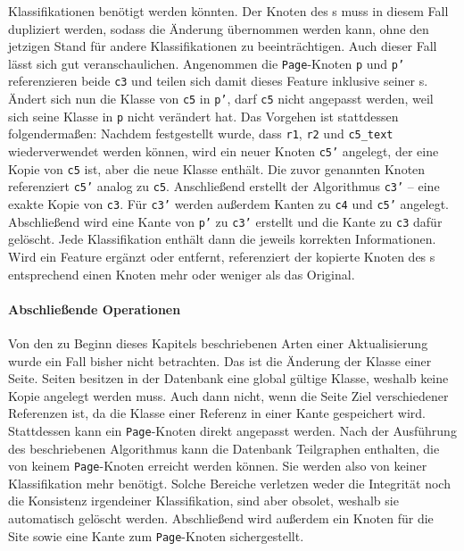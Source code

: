\begin{enumerate}
        Klassifikationen benötigt werden könnten.
        Der Knoten des {\parentFeature}s muss in diesem Fall dupliziert werden,
        sodass die Änderung übernommen werden kann,
        ohne den jetzigen Stand für andere Klassifikationen zu beeinträchtigen.
        Auch dieser Fall lässt sich gut veranschaulichen.
        Angenommen die \texttt{Page}-Knoten \texttt{p} und \texttt{p'} referenzieren beide \texttt{c3} und teilen sich damit
        dieses Feature inklusive seiner {\childFeature}s.
        Ändert sich nun die Klasse von \texttt{c5} in \texttt{p'},
        darf \texttt{c5} nicht angepasst werden, weil sich seine Klasse in \texttt{p} nicht verändert hat.
        Das Vorgehen ist stattdessen folgendermaßen:
        Nachdem festgestellt wurde, dass \texttt{r1}, \texttt{r2} und \texttt{c5\_text} wiederverwendet werden können,
        wird ein neuer Knoten \texttt{c5'} angelegt, der eine Kopie von \texttt{c5} ist, aber die neue Klasse enthält.
        Die zuvor genannten Knoten referenziert \texttt{c5'} analog zu \texttt{c5}.
        Anschließend erstellt der Algorithmus \texttt{c3'} -- eine exakte Kopie von \texttt{c3}.
        Für \texttt{c3'} werden außerdem Kanten zu \texttt{c4} und \texttt{c5'} angelegt.
        Abschließend wird eine Kante von \texttt{p'} zu \texttt{c3'} erstellt und die Kante zu \texttt{c3} dafür gelöscht.
        Jede Klassifikation enthält dann die jeweils korrekten Informationen.
        Wird ein Feature ergänzt oder entfernt, referenziert der kopierte Knoten des {\parentFeature}s
        entsprechend einen Knoten mehr oder weniger als das Original.
    \end{enumerate}

    \paragraph*{Abschließende Operationen}
    Von den zu Beginn dieses Kapitels beschriebenen Arten einer Aktualisierung wurde ein Fall bisher nicht betrachten.
    Das ist die Änderung der Klasse einer Seite.
    Seiten besitzen in der Datenbank eine global gültige Klasse,
    weshalb keine Kopie angelegt werden muss.
    Auch dann nicht, wenn die Seite Ziel verschiedener Referenzen ist,
    da die Klasse einer Referenz in einer Kante gespeichert wird.
    Stattdessen kann ein \texttt{Page}-Knoten direkt angepasst werden.
    Nach der Ausführung des beschriebenen Algorithmus kann die Datenbank
    Teilgraphen enthalten, die von keinem \texttt{Page}-Knoten erreicht werden können.
    Sie werden also von keiner Klassifikation mehr benötigt.
    Solche Bereiche verletzen weder die Integrität noch die Konsistenz irgendeiner Klassifikation,
    sind aber obsolet, weshalb sie automatisch gelöscht werden.
    Abschließend wird außerdem ein Knoten für die Site sowie eine Kante zum \texttt{Page}-Knoten sichergestellt.

